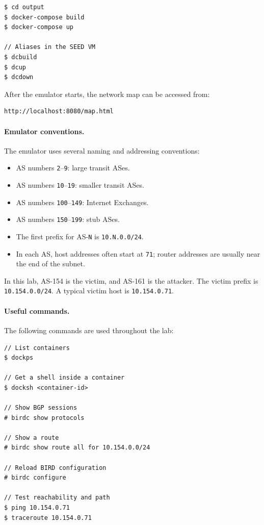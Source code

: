 \begin{lstlisting}
$ cd output
$ docker-compose build
$ docker-compose up

// Aliases in the SEED VM
$ dcbuild
$ dcup
$ dcdown
\end{lstlisting}

After the emulator starts, the network map can be accessed from:

\begin{lstlisting}
http://localhost:8080/map.html
\end{lstlisting}

\paragraph{Emulator conventions.}
The emulator uses several naming and addressing conventions:

\begin{itemize}[noitemsep]
\item AS numbers \texttt{2}--\texttt{9}: large transit ASes.
\item AS numbers \texttt{10}--\texttt{19}: smaller transit ASes.
\item AS numbers \texttt{100}--\texttt{149}: Internet Exchanges.
\item AS numbers \texttt{150}--\texttt{199}: stub ASes.
\item The first prefix for AS-\texttt{N} is \texttt{10.N.0.0/24}.
\item In each AS, host addresses often start at \texttt{71}; router addresses
      are usually near the end of the subnet.
\end{itemize}

In this lab, AS-154 is the victim, and AS-161 is the attacker. The victim
prefix is \texttt{10.154.0.0/24}. A typical victim host is
\texttt{10.154.0.71}.

\paragraph{Useful commands.}
The following commands are used throughout the lab:

\begin{lstlisting}
// List containers
$ dockps

// Get a shell inside a container
$ docksh <container-id>

// Show BGP sessions
# birdc show protocols

// Show a route
# birdc show route all for 10.154.0.0/24

// Reload BIRD configuration
# birdc configure

// Test reachability and path
$ ping 10.154.0.71
$ traceroute 10.154.0.71
\end{lstlisting}

